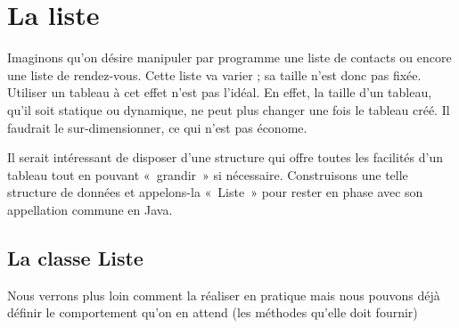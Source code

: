 
\chapter{La liste}



Imaginons qu’on désire manipuler par programme une liste de contacts ou
encore une liste de rendez-vous. Cette liste va varier ; sa taille
n’est donc pas fixée. Utiliser un tableau à cet effet n’est pas
l’idéal. En effet, la taille d’un tableau, qu’il soit statique ou
dynamique, ne peut plus changer une fois le tableau créé. Il faudrait
le sur-dimensionner, ce qui n’est pas économe.

Il serait intéressant de disposer d’une structure qui offre toutes les
facilités d’un tableau tout en pouvant «~grandir~» si nécessaire.
Construisons une telle structure de données et appelons-la «~Liste~»
pour rester en phase avec son appellation commune en Java.


\section{La classe Liste}

Nous verrons plus loin comment la réaliser en pratique mais nous pouvons
déjà définir le comportement qu’on en attend (les méthodes qu’elle doit
fournir)



